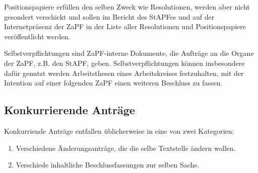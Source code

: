 \documentclass[12pt,oneside]{scrartcl}
\begin{document}
Positionspapiere erfüllen den selben Zweck wie Resolutionen, werden aber
nicht gesondert verschickt und sollen im Bericht des StAPFes und auf der
Internetpräsenz der ZaPF in der Liste aller Resolutionen und Positionspapiere
veröffentlicht werden.

Selbstverpflichtungen sind ZaPF-interne Dokumente, die Aufträge an die Organe
der ZaPF, z.B. den StAPF, geben. Selbstverpflichtungen können insbesondere dafür
genutzt werden Arbeitsthesen eines Arbeitskreises festzuhalten, mit der
Intention auf einer folgenden ZaPF einen weiteren Beschluss zu fassen.


\subsection{Konkurrierende Anträge%
  \label{konkurrierende-antrage}%
}

Konkurriende Anträge entfallen üblicherweise in eine von zwei Kategorien:

\begin{enumerate}
\item Verschiedene Änderungsanträge, die die selbe Textstelle ändern wollen.

\item Verschiede inhaltliche Beschlussfassungen zur selben Sache.
\end{enumerate}
\end{document}
